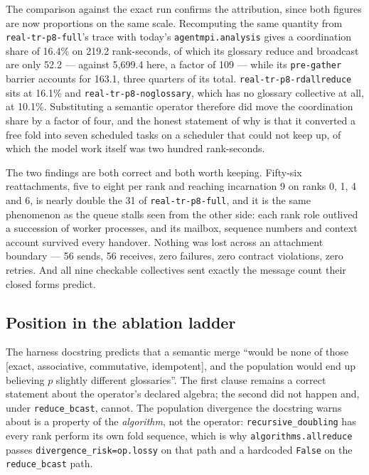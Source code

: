 \documentclass[11pt]{article}
\begin{document}
The comparison against the exact run confirms the attribution, since both figures are now
proportions on the same scale. Recomputing the same quantity from
\texttt{real-tr-p8-full}'s trace with today's \texttt{agentmpi.analysis} gives a coordination
share of 16.4\% on 219.2 rank-seconds, of which its glossary reduce and broadcast are only 52.2
--- against 5{,}699.4 here, a factor of 109 --- while its \texttt{pre-gather} barrier accounts for
163.1, three quarters of its total. \texttt{real-tr-p8-rdallreduce} sits at 16.1\% and
\texttt{real-tr-p8-noglossary}, which has no glossary collective at all, at 10.1\%. Substituting
a semantic operator therefore did move the coordination share by a factor of four, and the honest
statement of why is that it converted a free fold into seven scheduled tasks on a scheduler that
could not keep up, of which the model work itself was two hundred rank-seconds.

The two  findings are both correct and both worth keeping. Fifty-six reattachments,
five to eight per rank and reaching incarnation 9 on ranks 0, 1, 4 and 6, is nearly double the 31
of \texttt{real-tr-p8-full}, and it is the same phenomenon as the queue stalls seen from the
other side: each rank role outlived a succession of worker processes, and its mailbox, sequence
numbers and context account survived every handover. Nothing was lost across an attachment
boundary --- 56 sends, 56 receives, zero failures, zero contract violations, zero retries. And
all nine checkable collectives sent exactly the message count their closed forms predict.

\subsection{Position in the ablation ladder}

The harness docstring predicts that a semantic merge ``would be none of those [exact,
associative, commutative, idempotent], and the population would end up believing $p$ slightly
different glossaries''. The first clause remains a correct statement about the operator's
declared algebra; the second did not happen and, under \texttt{reduce\_bcast}, cannot. The
population divergence the docstring warns about is a property of the \emph{algorithm}, not the
operator: \texttt{recursive\_doubling} has every rank perform its own fold sequence, which is why
\texttt{algorithms.allreduce} passes \texttt{divergence\_risk=op.lossy} on that path and a
hardcoded \texttt{False} on the \texttt{reduce\_bcast} path.
\end{document}
